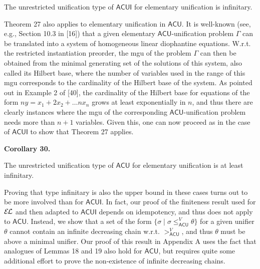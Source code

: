 
The unrestricted unification type of $\mathsf{ACUI}$ for elementary unification is infinitary.\par
 
 
 
 
Theorem 27 also applies to elementary unification in $\mathsf{ACU}$. It is well-known (see, e.g., Section 10.3 in [16]) that a given elementary $\mathsf{ACU}$-unification problem $\Gamma$ can be translated into a system of homogeneous linear diophantine equations. W.r.t. the restricted instantiation preorder, the mgu of the problem $\Gamma$ can then be obtained from the minimal generating set of the solutions of this system, also called its Hilbert base, where the number of variables used in the range of this mgu corresponds to the cardinality of the Hilbert base of the system. As pointed out in Example 2 of [40], the cardinality of the Hilbert base for equations of the form $ny=x_{1}+2x_{2}+\ldots nx_{n}$ grows at least exponentially in $n$, and thus there are clearly instances where the mgu of the corresponding $\mathsf{ACU}$-unification problem needs more than $n+1$ variables. Given this, one can now proceed as in the case of $\mathsf{ACUI}$ to show that Theorem 27 applies.\par
 
 
 
\par\medskip\noindent\textbf{Corollary 30.}\par
 
 
The unrestricted unification type of $\mathsf{ACU}$ for elementary unification is at least infinitary.\par
 
 
 
 
Proving that type infinitary is also the upper bound in these cases turns out to be more involved than for $\mathsf{ACUI}$. In fact, our proof of the finiteness result used for $\mathcal{E\mkern-1.618muL}$ and then adapted to $\mathsf{ACUI}$ depends on idempotency, and thus does not apply to $\mathsf{ACU}$. Instead, we show that a set of the form $\{\sigma\mid\sigma\leq_{\mathsf{ACU}}^{V}\theta\}$ for a given unifier $\theta$ cannot contain an infinite decreasing chain w.r.t. $>_{\mathsf{ACU}}^{V}$, and thus $\theta$ must be above a minimal unifier. Our proof of this result in Appendix A uses the fact that analogues of Lemmas 18 and 19 also hold for $\mathsf{ACU}$, but requires quite some additional effort to prove the non-existence of infinite decreasing chains.\par
 
